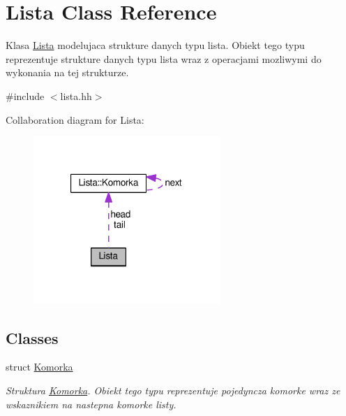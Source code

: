 \hypertarget{class_lista}{\section{Lista Class Reference}
\label{class_lista}
}


Klasa \hyperlink{class_lista}{Lista} modelujaca strukture danych typu lista. Obiekt tego typu reprezentuje strukture danych typu lista wraz z operacjami mozliwymi do wykonania na tej strukturze.  




{\ttfamily \#include $<$lista.\-hh$>$}



Collaboration diagram for Lista\-:\nopagebreak
\begin{figure}[H]
\begin{center}
\leavevmode
\includegraphics[width=201pt]{class_lista__coll__graph}
\end{center}
\end{figure}
\subsection*{Classes}
\begin{DoxyCompactItemize}
\item 
struct \hyperlink{struct_lista_1_1_komorka}{Komorka}
\begin{DoxyCompactList}\small\item\em Struktura \hyperlink{struct_lista_1_1_komorka}{Komorka}. Obiekt tego typu reprezentuje pojedyncza komorke wraz ze wskaznikiem na nastepna komorke listy. \end{DoxyCompactList}\end{DoxyCompactItemize}
